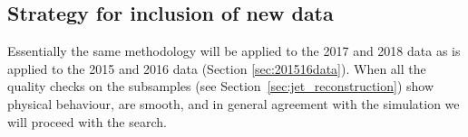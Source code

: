  
\subsection{Strategy for inclusion of new data}
\label{sec:blinding}

Essentially the same methodology will be  applied to the 2017 and 2018 data as is applied to 
the 2015 and 2016 data  (Section \ref{sec:201516data}). When all the quality checks on the 
subsamples (see Section~\ref{sec:jet_reconstruction}) show physical behaviour, are smooth, and 
in general agreement
with the simulation we will proceed with the search.
 
